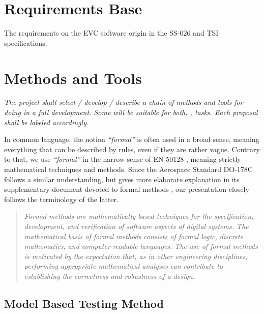 \documentclass{template/openetcs_report}
\begin{document}
\section{Requirements Base}
\label{sec:requirements-base}

The requirements on the EVC software origin in the SS-026 and TSI
specifications.


\section{\VV Methods and Tools }
\label{sec:methods-tools}

{\it The project shall select / develop / describe a chain of methods
  and tools for doing \vv in a full development. Some will be
  suitable for both, \vv, tasks. Each proposal shall be labeled accordingly.}


In common language, the notion {\em ``formal''} is often used in a
broad sense, meaning everything that can be described by rules, even
if they are rather vague.
%
Contrary to that, we use {\em ``formal''} in the narrow sense of
EN-50128 \cite[Section~D.28]{en50128},
meaning strictly mathematical techniques and methods.
%
Since the Aerospace Standard DO-178C \cite{DO-178C}
follows a similar understanding,
but gives more elaborate explanation in its supplementary document
devoted to formal methods \cite{DO-333},
our presentation closely follows the terminology of the latter.


\begin{quote}
{\em Formal methods are mathematically based techniques for the
specification, development, and verification of software aspects of
digital systems.
%
The mathematical basis of formal methods consists
of formal logic, discrete mathematics, and computer-readable
languages.
%
The use of formal methods is motivated by the expectation
that, as in other engineering disciplines, performing appropriate
mathematical analyses can contribute to establishing the correctness
and robustness of a design.}

\hfill
\cite[Section~1.0, p.1]{DO-333}
\end{quote}

\subsection{Model Based Testing Method}
\end{document}

